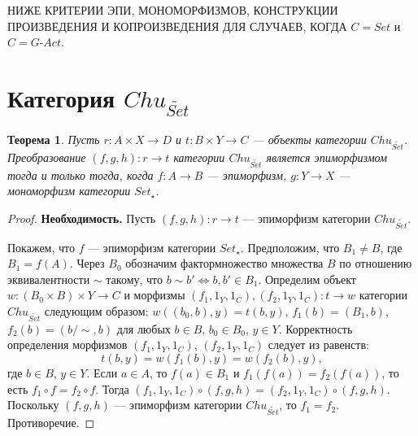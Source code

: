 \documentclass[a4paper,12pt]{article}
\newtheorem{theorem}{Теорема}
\newcommand{\GAct}{G\text{-}Act}
\begin{document}
НИЖЕ КРИТЕРИИ ЭПИ, МОНОМОРФИЗМОВ, КОНСТРУКЦИИ ПРОИЗВЕДЕНИЯ И КОПРОИЗВЕДЕНИЯ ДЛЯ СЛУЧАЕВ, КОГДА $C = Set$ и $C = \GAct$.

\section*{Категория $Chu_{\widetilde{Set}}$}

\begin{theorem}\label{epimorphism}
    Пусть $r: A \times X \to D$ и $t: B \times Y \to C$ --- объекты категории $Chu_{\widetilde{Set}}$. Преобразование $(f,g,h): r \to t$ категории $Chu_{\widetilde{Set}}$ является эпиморфизмом тогда и только тогда, когда $f: A \to B$ --- эпиморфизм, $g: Y \to X$ --- мономорфизм категории $Set_{\star}$.
\end{theorem}
\begin{proof}
    \textbf{Необходимость.} Пусть $(f,g,h): r \to t$ --- эпиморфизм категории $Chu_{\widetilde{Set}}$.

    Покажем, что $f$ --- эпиморфизм категории $Set_{\star}$. Предположим, что $B_1 \ne B$, где $B_1 = f(A)$. Через $B_0$ обозначим фактормножество множества $B$ по отношению эквивалентности $\sim$ такому, что $b \sim b' \Leftrightarrow b, b' \in B_1$. Определим объект $w: (B_0 \times B) \times Y \to C$ и морфизмы $(f_1,1_Y,1_C), (f_2,1_Y,1_C): t \to w$ категории $Chu_{\widetilde{Set}}$ следующим образом: $w((b_0,b),y) = t(b,y)$, $f_1(b) = (B_1,b)$, $f_2(b) = (b/\sim,b)$ для любых $b \in B$, $b_0 \in B_0$, $y \in Y$. Корректность определения морфизмов $(f_1,1_Y,1_C)$, $(f_2,1_Y,1_C)$ следует из равенств:
    $$
        t(b,y) = w(f_1(b),y) = w(f_2(b),y),
    $$
    где $b \in B$, $y \in Y$. Если $a \in A$, то $f(a) \in B_1$ и $f_1(f(a)) = f_2(f(a))$, то есть $f_1 \circ f = f_2 \circ f$. Тогда $(f_1,1_Y,1_C) \circ (f,g,h) = (f_2,1_Y,1_C) \circ (f,g,h)$. Поскольку $(f,g,h)$ --- эпиморфизм категории $Chu_{\widetilde{Set}}$, то $f_1 = f_2$. Противоречие.


\end{proof}
\end{document}

